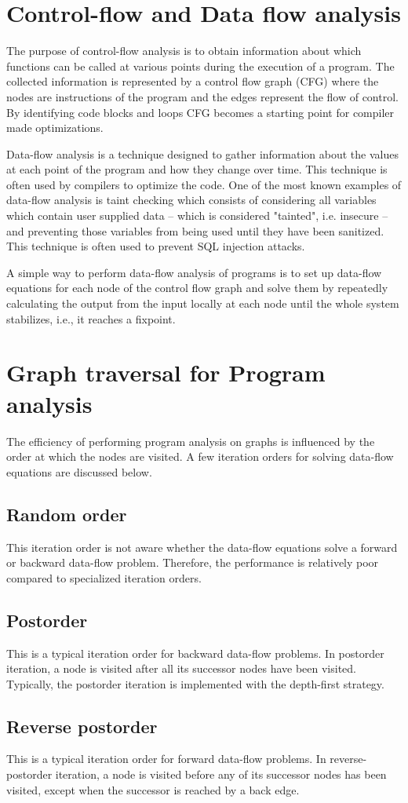 \section{Control-flow and Data flow analysis}
The purpose of control-flow analysis is to obtain information about which functions can be called at various points during the execution of a program. The collected information is represented by a control flow graph (CFG) where the nodes are instructions of the program and the edges represent the flow of control. By identifying code blocks and loops CFG becomes a starting point for compiler made optimizations.

Data-flow analysis is a technique designed to gather information about the values at each point of the program and how they change over time. This technique is often used by compilers to optimize the code. One of the most known examples of data-flow analysis is taint checking which consists of considering all variables which contain user supplied data – which is considered "tainted", i.e. insecure – and preventing those variables from being used until they have been sanitized. This technique is often used to prevent SQL injection attacks.

A simple way to perform data-flow analysis of programs is to set up data-flow equations for each node of the control flow graph and solve them by repeatedly calculating the output from the input locally at each node until the whole system stabilizes, i.e., it reaches a fixpoint.

\section{Graph traversal for Program analysis}
The efficiency of performing program analysis on graphs is influenced by the order at which the nodes are visited. A few iteration orders for solving data-flow equations are discussed below.
\subsection{Random order}
This iteration order is not aware whether the data-flow equations solve a forward or backward data-flow problem. Therefore, the performance is relatively poor compared to specialized iteration orders.
\subsection{Postorder}
This is a typical iteration order for backward data-flow problems. In postorder iteration, a node is visited after all its successor nodes have been visited. Typically, the postorder iteration is implemented with the depth-first strategy.
\subsection{Reverse postorder}
This is a typical iteration order for forward data-flow problems. In reverse-postorder iteration, a node is visited before any of its successor nodes has been visited, except when the successor is reached by a back edge. 